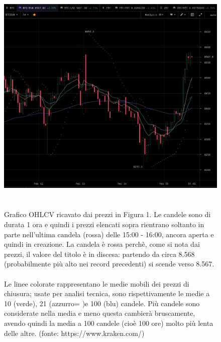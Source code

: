 \documentclass{article}
\numberwithin{equation}{section}
\begin{document}
		\begin{figure}
		\begin{center}
		\includegraphics[width=\linewidth]{kraken_ohlcv}
		\caption{\\~\\Grafico OHLCV ricavato dai prezzi in Figura 1. Le candele sono di durata 1 ora e quindi i prezzi elencati sopra rientrano soltanto in parte nell'ultima candela (rossa) delle 15:00 - 16:00, ancora aperta e quindi in creazione. La candela è rossa perchè, come si nota dai prezzi, il valore del titolo  è in discesa: partendo da circa 8.568 (probabilmente più alto nei record precedenti) si scende verso 8.567.\\~\\Le linee colorate rappresentano le medie mobili dei prezzi di chiusura; usate per analisi tecnica, sono rispettivamente le medie a 10 (verde), 21 (azzurro= )e 100 (blu) candele. Più candele sono considerate nella media e meno questa cambierà bruscamente, avendo quindi la media a 100 candele (cioè 100 ore) molto più lenta delle altre. (fonte: https://www.kraken.com/)}
		\end{center}
		\end{figure}

		
		
\end{document}
